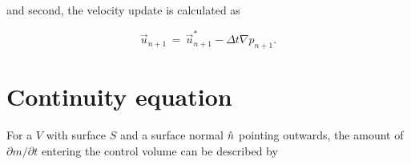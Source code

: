 and second, the velocity update is calculated as

\begin{equation} \label{eq:velocity_update}
\vec{u}_{n+1} \,=\, \vec{u}^*_{n+1} - \Delta t\nabla p_{n+1}.
\end{equation}






\section{Continuity equation}

For a  $V$ with surface $S$ and a surface normal $\hat{n}$ pointing outwards, the amount of  $\partial m/\partial t$ entering the control volume can be described by

